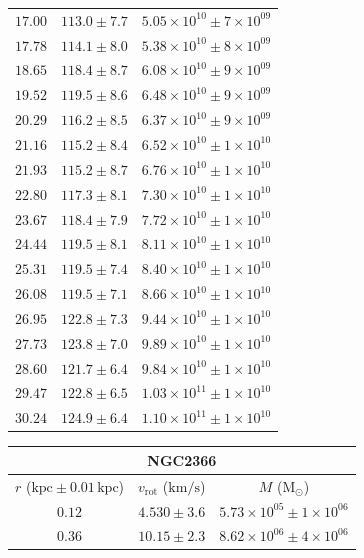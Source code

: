 \documentclass{article}
\newcommand\solmass{\textrm{M}_\odot}
\newcommand\kpc{\textrm{kpc}}
\newcommand\kmps{\textrm{km}/\textrm{s}}
\newcommand\vrot{\ensuremath{v_{\textrm{rot}}}}
\begin{document}
\begin{table}[h!]
\begin{tabular}{|c|c|c|}
        $17.00$ & $113.0 \pm 7.7$ & $5.05\times 10^{10} \pm 7\times 10^{09}$ \\
        $17.78$ & $114.1 \pm 8.0$ & $5.38\times 10^{10} \pm 8\times 10^{09}$ \\
        $18.65$ & $118.4 \pm 8.7$ & $6.08\times 10^{10} \pm 9\times 10^{09}$ \\
        $19.52$ & $119.5 \pm 8.6$ & $6.48\times 10^{10} \pm 9\times 10^{09}$ \\
        $20.29$ & $116.2 \pm 8.5$ & $6.37\times 10^{10} \pm 9\times 10^{09}$ \\
        $21.16$ & $115.2 \pm 8.4$ & $6.52\times 10^{10} \pm 1\times 10^{10}$ \\
        $21.93$ & $115.2 \pm 8.7$ & $6.76\times 10^{10} \pm 1\times 10^{10}$ \\
        $22.80$ & $117.3 \pm 8.1$ & $7.30\times 10^{10} \pm 1\times 10^{10}$ \\
        $23.67$ & $118.4 \pm 7.9$ & $7.72\times 10^{10} \pm 1\times 10^{10}$ \\
        $24.44$ & $119.5 \pm 8.1$ & $8.11\times 10^{10} \pm 1\times 10^{10}$ \\
        $25.31$ & $119.5 \pm 7.4$ & $8.40\times 10^{10} \pm 1\times 10^{10}$ \\
        $26.08$ & $119.5 \pm 7.1$ & $8.66\times 10^{10} \pm 1\times 10^{10}$ \\
        $26.95$ & $122.8 \pm 7.3$ & $9.44\times 10^{10} \pm 1\times 10^{10}$ \\
        $27.73$ & $123.8 \pm 7.0$ & $9.89\times 10^{10} \pm 1\times 10^{10}$ \\
        $28.60$ & $121.7 \pm 6.4$ & $9.84\times 10^{10} \pm 1\times 10^{10}$ \\
        $29.47$ & $122.8 \pm 6.5$ & $1.03\times 10^{11} \pm 1\times 10^{10}$ \\
        $30.24$ & $124.9 \pm 6.4$ & $1.10\times 10^{11} \pm 1\times 10^{10}$ \\
        \hline
    \end{tabular}
    \hfill
    \begin{tabular}{|c|c|c|}
        \hline
        \multicolumn{3}{|c|}{NGC2366} \\
        \hline
        $r$ ($\kpc \pm 0.01 \,\kpc$) & $\vrot$ ($\kmps$) & $M$ ($\solmass$) \\
        \hline
        $0.12$ & $4.530 \pm 3.6$ & $5.73\times 10^{05} \pm 1\times 10^{06}$ \\
        $0.36$ & $10.15 \pm 2.3$ & $8.62\times 10^{06} \pm 4\times 10^{06}$ \\

\end{tabular}
\end{table}
\end{document}
